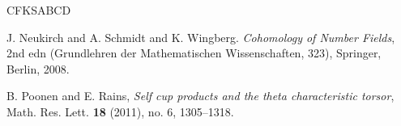 \documentclass[10pt]{amsart}
\numberwithin{equation}{section}
\theoremstyle{remark}
\theoremstyle{definition}
\theoremstyle{definition}
\theoremstyle{definition}
\theoremstyle{definition}
\theoremstyle{definition}
\theoremstyle{definition}
\theoremstyle{definition}
\theoremstyle{definition}
\begin{document}
\begin{thebibliography}{CFKSABCD}
              
  
  
        
              
%              
%              
%              
% 
%
%
% 
J. Neukirch and A. Schmidt and K. Wingberg. \textit{ Cohomology of Number Fields}, 2nd edn (Grundlehren
der Mathematischen Wissenschaften, 323), Springer, Berlin, 2008. 

 

 

  B. Poonen and E. Rains, \textit{Self cup products and the theta characteristic torsor}, Math. Res. Lett. \textbf{18} (2011), no. 6, 1305--1318.
% 
  
              

\end{thebibliography}
\end{document}

